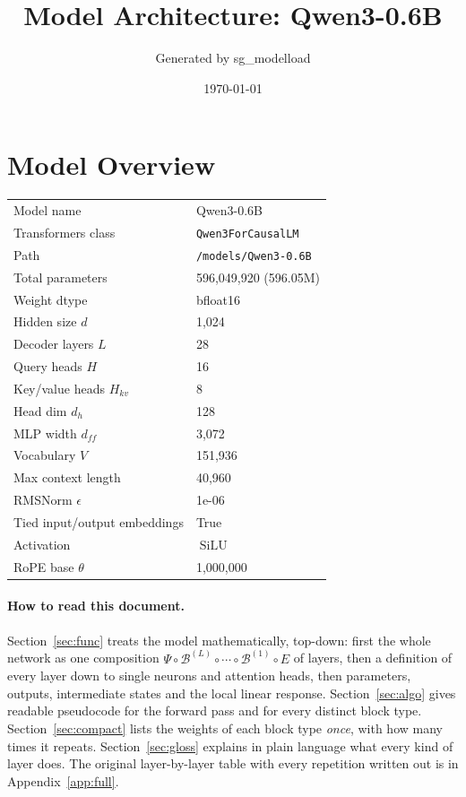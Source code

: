 \documentclass[10pt,a4paper]{article}
\title{Model Architecture: Qwen3-0.6B}
\author{Generated by sg\_modelload}
\date{\today}
\newcommand{\op}[1]{\operatorname{#1}}
\theoremstyle{definition}
\begin{document}
\maketitle
\tableofcontents
\clearpage
\section{Model Overview}
\begin{tabular}{ll}
\toprule
Model name & Qwen3-0.6B \\
Transformers class & \texttt{Qwen3ForCausalLM} \\
Path & \texttt{/models/Qwen3-0.\allowbreak{}6B} \\
Total parameters & 596,049,920 (596.05M) \\
Weight dtype & bfloat16 \\
\midrule
Hidden size $d$ & 1,024 \\
Decoder layers $L$ & 28 \\
Query heads $H$ & 16 \\
Key/value heads $H_{kv}$ & 8 \\
Head dim $d_h$ & 128 \\
MLP width $d_{ff}$ & 3,072 \\
Vocabulary $V$ & 151,936 \\
Max context length & 40,960 \\
RMSNorm $\epsilon$ & 1e-06 \\
Tied input/output embeddings & True \\
Activation & $\op{SiLU}$ \\
RoPE base $\theta$ & 1,000,000 \\
\bottomrule
\end{tabular}

\paragraph{How to read this document.} Section~\ref{sec:func} treats the model mathematically, top-down: first the whole network as one composition $\Psi\circ\mathcal{B}^{(L)}\circ\cdots\circ\mathcal{B}^{(1)}\circ E$ of layers, then a definition of every layer down to single neurons and attention heads, then parameters, outputs, intermediate states and the local linear response. Section~\ref{sec:algo} gives readable pseudocode for the forward pass and for every distinct block type. Section~\ref{sec:compact} lists the weights of each block type \emph{once}, with how many times it repeats. Section~\ref{sec:gloss} explains in plain language what every kind of layer does. The original layer-by-layer table with every repetition written out is in Appendix~\ref{app:full}.
\end{document}
